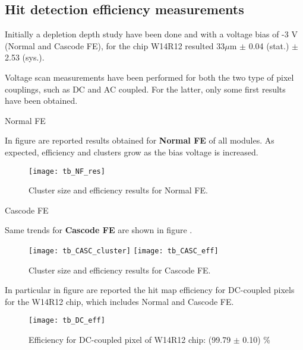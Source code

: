 \subsection{Hit detection efficiency measurements}

Initially a depletion depth study have been done and with a voltage bias of -3 V (Normal and Cascode FE), for the chip W14R12 resulted 33$\mu$m $\pm$ 0.04 (stat.) $\pm$ 2.53 (sys.).

Voltage scan measurements have been performed for both the two type of pixel couplings, such as DC and AC coupled. For the latter, only some first results have been obtained. 

\begin{description}
\item[Normal FE]
\end{description}

In figure  are reported results obtained for \textbf{Normal FE} of all modules. As expected, efficiency and clusters grow as the bias voltage is increased. 

\begin{figure}[h!]
\centering
\texttt{[image: tb\_NF\_res]}
\caption{Cluster size and efficiency results for Normal FE.}
\label{fig:tb_NF}
\end{figure}


\begin{description}
\item[Cascode FE]
\end{description}

Same trends for \textbf{Cascode FE} are shown in figure .

\begin{figure}[h!]
\centering
\subfigure
{\texttt{[image: tb\_CASC\_cluster]}}\quad
\subfigure
{\texttt{[image: tb\_CASC\_eff]}}\\
\caption{Cluster size and efficiency results for Cascode FE.}
\label{fig:tb_CASC}
\end{figure}


In particular in figure  are reported the hit map efficiency for DC-coupled pixels for the W14R12 chip, which includes Normal and Cascode FE.

\begin{figure}[h!]
\centering
\texttt{[image: tb\_DC\_eff]}
\caption{Efficiency for DC-coupled pixel of W14R12 chip: (99.79 $\pm$ 0.10) \%}
\label{fig:tb_DC_Cz}
\end{figure}



